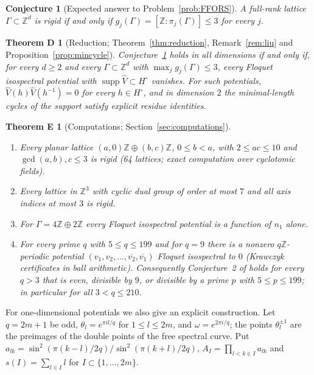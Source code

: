 \documentclass[11pt,reqno]{amsart}
\newtheorem{conjecture}[theorem]{Conjecture}
\newtheorem*{theoremD}{Theorem D}
\newtheorem*{theoremE}{Theorem E}
\theoremstyle{definition}
\theoremstyle{remark}
\newcommand{\Z}{\mathbb Z}
\DeclareMathOperator{\supp}{supp}
\begin{document}
\begin{conjecture}[Expected answer to Problem~\ref{prob:FFORS}]\label{conj:classification}
A full-rank lattice $\Gamma\subset\Z^d$ is rigid if and only if
$g_j(\Gamma)=[\Z:\pi_j(\Gamma)]\le3$ for every $j$.
\end{conjecture}

\begin{theoremD}[Reduction; Theorem~\ref{thm:reduction}, Remark~\ref{rem:liu} and Proposition~\ref{prop:mincycle}]
Conjecture~\ref{conj:classification} holds in all dimensions if and only if,
for every $d\ge2$ and every $\Gamma\subset\Z^d$ with $\max_jg_j(\Gamma)\le3$,
every Floquet isospectral potential with $\supp\widehat V\subset H^\circ$
vanishes.  For such potentials, $\widehat V(h)\widehat V(h^{-1})=0$ for every
$h\in H^\circ$, and in dimension $2$ the minimal-length cycles of the support
satisfy explicit residue identities.
\end{theoremD}

\begin{theoremE}[Computations; Section~\ref{sec:computations}]
\begin{enumerate}[label=\textup{(\alph*)}]
\item Every planar lattice $(a,0)\Z\oplus(b,c)\Z$, $0\le b<a$, with $2\le ac\le10$ and
$\gcd(a,b),c\le3$ is rigid \textup{(64 lattices; exact computation over cyclotomic fields)}.
\item Every lattice in $\Z^3$ with cyclic dual group of order at most $7$ and all axis indices at most $3$ is rigid.
\item For $\Gamma=4\Z\oplus2\Z$ every Floquet isospectral potential is a function of $n_1$ alone.
\item For every prime $q$ with $5\le q\le 199$ and for $q=9$ there is a nonzero
$q\Z$-periodic potential $(v_1,v_2,\dots,\overline{v_2},\overline{v_1})$
Floquet isospectral to $0$ \textup{(Krawczyk certificates in ball arithmetic)}.
Consequently Conjecture~2 of \cite{FFORS2026} holds for every $q>3$ that is
even, divisible by $9$, or divisible by a prime $p$ with $5\le p\le 199$; in
particular for all $3<q\le 210$.
\end{enumerate}
\end{theoremE}

For one-dimensional potentials we also give an explicit construction.  Let
$q=2m+1$ be odd, $\theta_l=e^{\pi il/q}$ for $1\le l\le 2m$, and
$\omega=e^{2\pi i/q}$; the points $\theta_l^{\pm1}$ are the preimages of the
double points of the free spectral curve.  Put
$a_{lk}=\sin^2(\pi(k-l)/2q)/\sin^2(\pi(k+l)/2q)$, $A_I=\prod_{l<k\in I}a_{lk}$
and $s(I)=\sum_{l\in I}l$ for $I\subset\{1,\dots,2m\}$.
\end{document}
